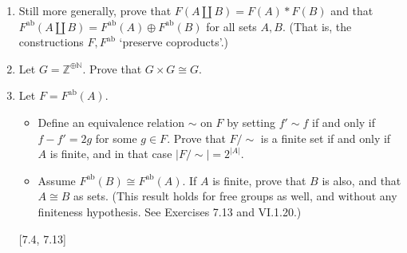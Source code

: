 \begin{enumerate}
    \item Still more generally, prove that $F(A \coprod B) = F(A) \ast F(B)$ and that $F^{\text{ab}}(A \coprod B) = F^{\text{ab}}(A) \oplus F^{\text{ab}}(B)$ for all sets $A, B$. (That is, the constructions $F, F^{\text{ab}}$ `preserve coproducts'.)

    \item Let $G = \mathbb{Z}^{\oplus \mathbb{N}}$. Prove that $G \times G \cong G$.

    \item Let $F = F^{\text{ab}}(A)$.
          \begin{itemize}
              \item Define an equivalence relation $\sim$ on $F$ by setting $f' \sim f$ if and only if $f - f' = 2g$ for some $g \in F$. Prove that $F/\sim$ is a finite set if and only if $A$ is finite, and in that case $|F/\sim| = 2^{|A|}$.
              \item Assume $F^{\text{ab}}(B) \cong F^{\text{ab}}(A)$. If $A$ is finite, prove that $B$ is also, and that $A \cong B$ as sets. (This result holds for free groups as well, and without any finiteness hypothesis. See Exercises 7.13 and VI.1.20.)
          \end{itemize}


          [7.4, 7.13]
\end{enumerate}